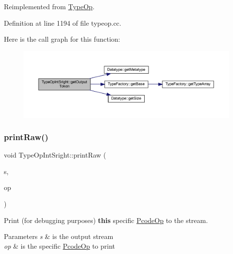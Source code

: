 Reimplemented from \mbox{\hyperlink{class_type_op_a7150ac93bb03a993735c829deb5237e7}{Type\+Op}}.



Definition at line 1194 of file typeop.\+cc.

Here is the call graph for this function\+:
\nopagebreak
\begin{figure}[H]
\begin{center}
\leavevmode
\includegraphics[width=350pt]{class_type_op_int_sright_a2e2989e20e9ccdcd2e56d719202ac0fc_cgraph}
\end{center}
\end{figure}
\mbox{\label{class_type_op_int_sright_a1559e48c6d810e3c092f3b9957528ec8}} 
\subsubsection{\texorpdfstring{printRaw()}{printRaw()}}
{\footnotesize\ttfamily void Type\+Op\+Int\+Sright\+::print\+Raw (\begin{DoxyParamCaption}\item[{ostream \&}]{s,  }\item[{const \mbox{\hyperlink{class_pcode_op}{Pcode\+Op}} $\ast$}]{op }\end{DoxyParamCaption})\hspace{0.3cm}{\ttfamily [virtual]}}



Print (for debugging purposes) {\bfseries{this}} specific \mbox{\hyperlink{class_pcode_op}{Pcode\+Op}} to the stream. 


\begin{DoxyParams}{Parameters}
{\em s} & is the output stream \\
\hline
{\em op} & is the specific \mbox{\hyperlink{class_pcode_op}{Pcode\+Op}} to print \\
\hline
\end{DoxyParams}


